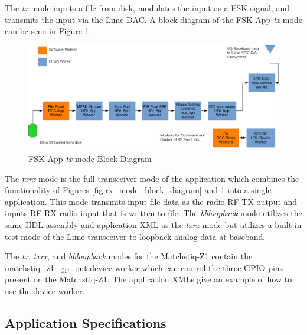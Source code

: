 \noindent The \textit{tx} mode inputs a file from disk, modulates the input as a FSK signal, and transmits the input via the Lime DAC. A block diagram of the FSK App \textit{tx} mode can be seen in Figure \ref{fig:tx_mode_block_diagram}.
	\begin{figure}[H]
	 	\centering
		\includegraphics[scale=.55]{tx_mode_block_diagram}
		\caption{FSK App \textit{tx} mode Block Diagram}
		\label{fig:tx_mode_block_diagram}
	\end{figure}

\noindent The \textit{txrx} mode is the full transceiver mode of the application which combines the functionality of Figures \ref{fig:rx_mode_block_diagram} and \ref{fig:tx_mode_block_diagram} into a single application. This mode transmits input file data as the radio RF TX output and inputs RF RX radio input that is written to file. The \textit{bbloopback} mode utilizes the same HDL assembly and application XML as the \textit{txrx} mode but utilizes a built-in test mode of the Lime transceiver to loopback analog data at baseband.\par\medskip

\noindent The \textit{tx}, \textit{txrx}, and \textit{bbloopback} modes for the Matchstiq-Z1 contain the matchstiq\_z1\_gp\_out device worker which can control the three GPIO pins present on the Matchstiq-Z1. The application XMLs give an example of how to use the device worker.\par\medskip
\subsection{Application Specifications}
